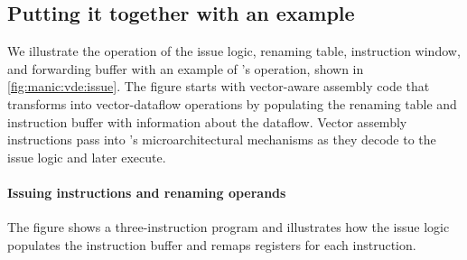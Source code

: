 \subsection{Putting it together with an example}
We illustrate the operation of the issue logic, renaming table, instruction
window, and forwarding buffer with an example of \manic's operation, shown in
\autoref{fig:manic:vde:issue}. 
%
The figure starts with vector-aware assembly code that \manic transforms into
vector-dataflow operations by populating the renaming table and instruction
buffer with information about the dataflow.
%
Vector assembly instructions pass into \manic's microarchitectural mechanisms
as they decode to the issue logic and later execute.
%

\figMANICMANICa

\paragraph{Issuing instructions and renaming operands}
The figure shows a three-instruction program and illustrates how
the issue logic populates the instruction buffer and remaps registers for each
instruction.

